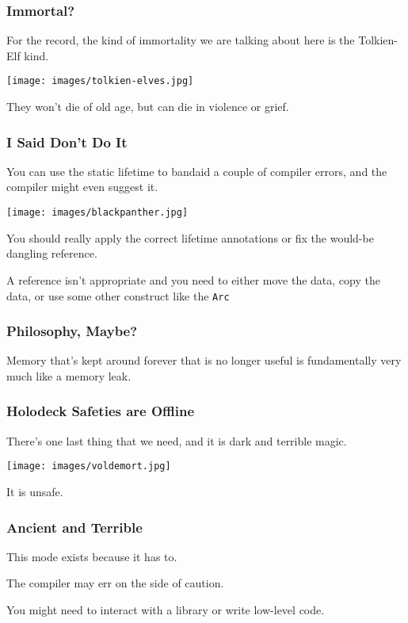 \begin{frame}
\frametitle{Immortal?}

For the record, the kind of immortality we are talking about here is the Tolkien-Elf kind.

\begin{center}
	\texttt{[image: images/tolkien-elves.jpg]}
\end{center}

They won't die of old age, but can die in violence or grief.

\end{frame}


\begin{frame}
\frametitle{I Said Don't Do It}

You can use the static lifetime to bandaid a couple of compiler errors, and the compiler might even suggest it. 

\begin{center}
	\texttt{[image: images/blackpanther.jpg]}
\end{center}


You should really apply the correct lifetime annotations or fix the would-be dangling reference.


A reference isn't appropriate and you need to either move the data, copy the data, or use some other construct like the \texttt{Arc} 
\end{frame}


\begin{frame}
\frametitle{Philosophy, Maybe?}

Memory that's kept around forever that is no longer useful is fundamentally very much like a memory leak.

\end{frame}


\begin{frame}
\frametitle{Holodeck Safeties are Offline}


There's one last thing that we need, and it is dark and terrible magic. 

\begin{center}
	\texttt{[image: images/voldemort.jpg]}
\end{center}

It is \alert{unsafe}. 

\end{frame}


\begin{frame}
\frametitle{Ancient and Terrible}

This mode exists because it has to.

The compiler may err on the side of caution.

You might need to interact with a library or write low-level code.


\end{frame}

